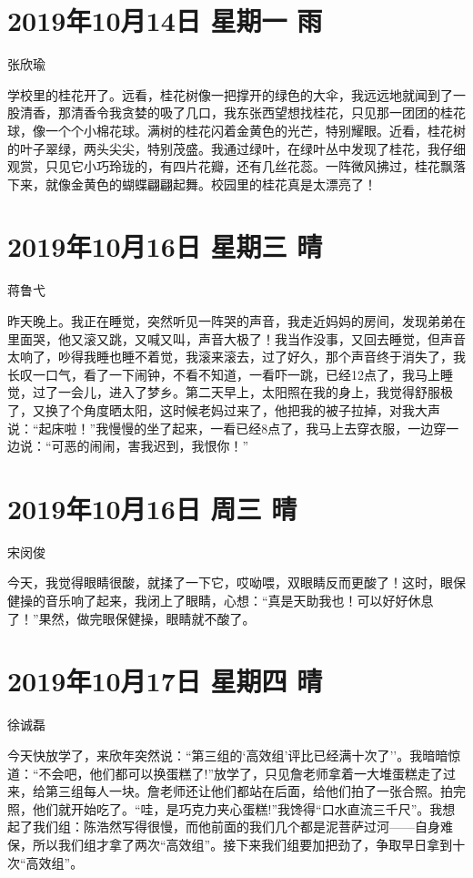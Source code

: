 \section{2019年10月14日 星期一 雨}

张欣瑜

学校里的桂花开了。远看，桂花树像一把撑开的绿色的大伞，我远远地就闻到了一股清香，那清香令我贪婪的吸了几口，我东张西望想找桂花，只见那一团团的桂花球，像一个个小棉花球。满树的桂花闪着金黄色的光芒，特别耀眼。近看，桂花树的叶子翠绿，两头尖尖，特别茂盛。我通过绿叶，在绿叶丛中发现了桂花，我仔细观赏，只见它小巧玲珑的，有四片花瓣，还有几丝花蕊。一阵微风拂过，桂花飘落下来，就像金黄色的蝴蝶翩翩起舞。校园里的桂花真是太漂亮了！

\section{2019年10月16日 星期三 晴}

蒋鲁弋

昨天晚上。我正在睡觉，突然听见一阵哭的声音，我走近妈妈的房间，发现弟弟在里面哭，他又滚又跳，又喊又叫，声音大极了！我当作没事，又回去睡觉，但声音太响了，吵得我睡也睡不着觉，我滚来滚去，过了好久，那个声音终于消失了，我长叹一口气，看了一下闹钟，不看不知道，一看吓一跳，已经12点了，我马上睡觉，过了一会儿，进入了梦乡。第二天早上，太阳照在我的身上，我觉得舒服极了，又换了个角度晒太阳，这时候老妈过来了，他把我的被子拉掉，对我大声说：``起床啦！''我慢慢的坐了起来，一看已经8点了，我马上去穿衣服，一边穿一边说：``可恶的闹闹，害我迟到，我恨你！''

\section{2019年10月16日 周三 晴}

宋闵俊

今天，我觉得眼睛很酸，就揉了一下它，哎呦喂，双眼睛反而更酸了！这时，眼保健操的音乐响了起来，我闭上了眼睛，心想：``真是天助我也！可以好好休息了！''果然，做完眼保健操，眼睛就不酸了。

\section{2019年10月17日 星期四 晴}

徐诚磊

今天快放学了，来欣年突然说：``第三组的`高效组'评比已经满十次了''。我暗暗惊道：``不会吧，他们都可以换蛋糕了!''放学了，只见詹老师拿着一大堆蛋糕走了过来，给第三组每人一块。詹老师还让他们都站在后面，给他们拍了一张合照。拍完照，他们就开始吃了。``哇，是巧克力夹心蛋糕!''我馋得``口水直流三千尺''。我想起了我们组：陈浩然写得很慢，而他前面的我们几个都是泥菩萨过河------自身难保，所以我们组才拿了两次``高效组''。接下来我们组要加把劲了，争取早日拿到十次``高效组''。

